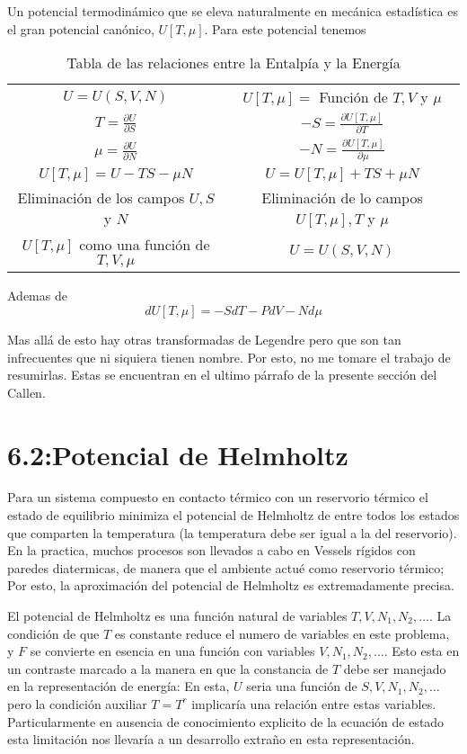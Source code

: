 \documentclass{report}
\begin{document}
Un potencial termodinámico que se eleva naturalmente en mecánica estadística es el gran potencial canónico, $U\left[ T,\mu \right] $. Para este potencial tenemos
\begin{table}[h]
  \centering
  \label{table:Canonico}
  \caption{Tabla de las relaciones entre la Entalpía y la Energía}
  \begin{tabular}{c|c}
    \hline
    $U=U(S,V,N)$ & $U\left[ T,\mu \right]= $ Función de $T,V$ y $\mu$ \\
    $T=\frac{\partial U}{\partial S}$ & $-S=\frac{\partial U\left[ T,\mu \right] }{\partial T}$ \\
    $\mu=\frac{\partial U}{\partial N}$ & $-N= \frac{\partial U\left[ T,\mu \right] }{\partial \mu}$ \\
    $U\left[ T,\mu \right]=U-TS-\mu N$ & $U=U\left[ T,\mu \right] +TS+\mu N$\\
    Eliminación de los campos $U,S$ y $N$ & Eliminación de lo campos $U\left[ T,\mu \right] ,T$ y $\mu$ \\
    $U\left[ T,\mu \right] $ como una función de $T,V,\mu$ & $U=U(S,V,N)$\\
    \hline
  \end{tabular}
\end{table}

Ademas de
\begin{equation}
  dU\left[ T,\mu \right] = -SdT-PdV-Nd\mu
\end{equation}

Mas allá de esto hay otras transformadas de Legendre pero que son tan infrecuentes que ni siquiera tienen nombre. Por esto, no me tomare el trabajo de resumirlas. Estas se encuentran en el ultimo párrafo de la presente sección del Callen.
\section{6.2:Potencial de Helmholtz}
Para un sistema compuesto en contacto térmico con un reservorio térmico el estado de equilibrio minimiza el potencial de Helmholtz de entre todos los estados que comparten la temperatura (la temperatura debe ser igual a la del reservorio). En la practica, muchos procesos son llevados a cabo en Vessels rígidos con paredes diatermicas, de manera que el ambiente actué como reservorio térmico; Por esto, la aproximación del potencial de Helmholtz es extremadamente precisa.

El potencial de Helmholtz es una función natural de variables $T,V,N_1,N_2,\ldots$. La condición de que $T$ es constante reduce el numero de variables en este problema, y $F$ se convierte en esencia en una función con variables $V,N_1,N_2,\ldots$. Esto esta en un contraste marcado a la manera en que la constancia de $T$ debe ser manejado en la representación de energía: En esta, $U$ seria una función de $S,V,N_1,N_2,\ldots$ pero la condición auxiliar $T=T^r$ implicaría una relación entre estas variables. Particularmente en ausencia de conocimiento explicito de la ecuación de estado esta limitación nos llevaría a un desarrollo extraño en esta representación.
\end{document}
